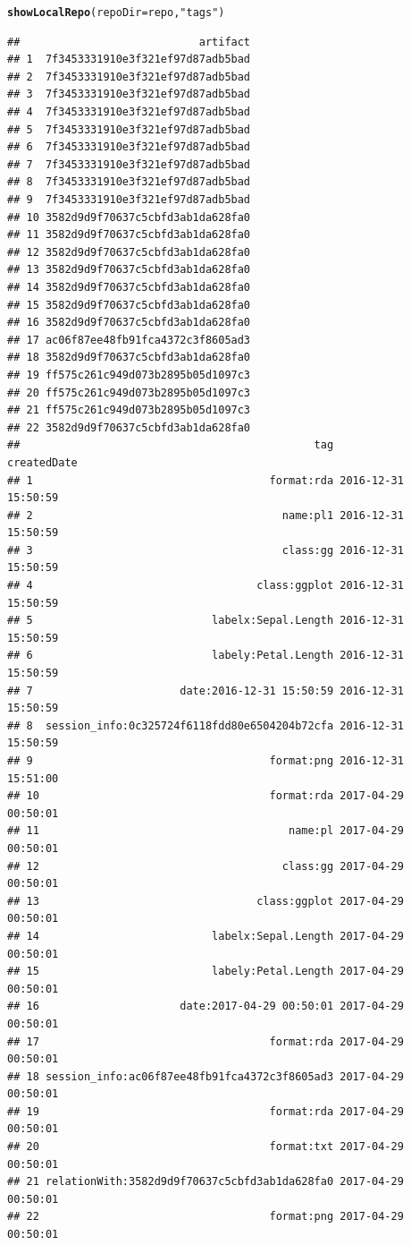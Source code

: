 \documentclass[nojss]{jss}\usepackage[]{graphicx}\usepackage[]{color}
\makeatletter
\newcommand{\hlstr}[1]{\textcolor[rgb]{0.192,0.494,0.8}{#1}}%
\newcommand{\hlstd}[1]{\textcolor[rgb]{0.345,0.345,0.345}{#1}}%
\newcommand{\hlkwc}[1]{\textcolor[rgb]{0.333,0.667,0.333}{#1}}%
\newcommand{\hlkwd}[1]{\textcolor[rgb]{0.737,0.353,0.396}{\textbf{#1}}}%
\newenvironment{kframe}{%
 \def\at@end@of@kframe{}%
 \ifinner\ifhmode%
  \def\at@end@of@kframe{\end{minipage}}%
  \begin{minipage}{\columnwidth}%
 \fi\fi%
 \def\FrameCommand##1{\hskip\@totalleftmargin \hskip-\fboxsep
 \colorbox{shadecolor}{##1}\hskip-\fboxsep
     \hskip-\linewidth \hskip-\@totalleftmargin \hskip\columnwidth}%
 \MakeFramed {\advance\hsize-\width
   \@totalleftmargin\z@ \linewidth\hsize
   \@setminipage}}%
 {\par\unskip\endMakeFramed%
 \at@end@of@kframe}
\newenvironment{knitrout}{}{} %
\makeatother
\begin{document}
\begin{knitrout}
\color{fgcolor}\begin{kframe}
\begin{alltt}
\hlkwd{showLocalRepo}\hlstd{(}\hlkwc{repoDir} \hlstd{= repo,} \hlstr{"tags"}\hlstd{)}
\end{alltt}
\begin{verbatim}
##                            artifact
## 1  7f3453331910e3f321ef97d87adb5bad
## 2  7f3453331910e3f321ef97d87adb5bad
## 3  7f3453331910e3f321ef97d87adb5bad
## 4  7f3453331910e3f321ef97d87adb5bad
## 5  7f3453331910e3f321ef97d87adb5bad
## 6  7f3453331910e3f321ef97d87adb5bad
## 7  7f3453331910e3f321ef97d87adb5bad
## 8  7f3453331910e3f321ef97d87adb5bad
## 9  7f3453331910e3f321ef97d87adb5bad
## 10 3582d9d9f70637c5cbfd3ab1da628fa0
## 11 3582d9d9f70637c5cbfd3ab1da628fa0
## 12 3582d9d9f70637c5cbfd3ab1da628fa0
## 13 3582d9d9f70637c5cbfd3ab1da628fa0
## 14 3582d9d9f70637c5cbfd3ab1da628fa0
## 15 3582d9d9f70637c5cbfd3ab1da628fa0
## 16 3582d9d9f70637c5cbfd3ab1da628fa0
## 17 ac06f87ee48fb91fca4372c3f8605ad3
## 18 3582d9d9f70637c5cbfd3ab1da628fa0
## 19 ff575c261c949d073b2895b05d1097c3
## 20 ff575c261c949d073b2895b05d1097c3
## 21 ff575c261c949d073b2895b05d1097c3
## 22 3582d9d9f70637c5cbfd3ab1da628fa0
##                                              tag         createdDate
## 1                                     format:rda 2016-12-31 15:50:59
## 2                                       name:pl1 2016-12-31 15:50:59
## 3                                       class:gg 2016-12-31 15:50:59
## 4                                   class:ggplot 2016-12-31 15:50:59
## 5                            labelx:Sepal.Length 2016-12-31 15:50:59
## 6                            labely:Petal.Length 2016-12-31 15:50:59
## 7                       date:2016-12-31 15:50:59 2016-12-31 15:50:59
## 8  session_info:0c325724f6118fdd80e6504204b72cfa 2016-12-31 15:50:59
## 9                                     format:png 2016-12-31 15:51:00
## 10                                    format:rda 2017-04-29 00:50:01
## 11                                       name:pl 2017-04-29 00:50:01
## 12                                      class:gg 2017-04-29 00:50:01
## 13                                  class:ggplot 2017-04-29 00:50:01
## 14                           labelx:Sepal.Length 2017-04-29 00:50:01
## 15                           labely:Petal.Length 2017-04-29 00:50:01
## 16                      date:2017-04-29 00:50:01 2017-04-29 00:50:01
## 17                                    format:rda 2017-04-29 00:50:01
## 18 session_info:ac06f87ee48fb91fca4372c3f8605ad3 2017-04-29 00:50:01
## 19                                    format:rda 2017-04-29 00:50:01
## 20                                    format:txt 2017-04-29 00:50:01
## 21 relationWith:3582d9d9f70637c5cbfd3ab1da628fa0 2017-04-29 00:50:01
## 22                                    format:png 2017-04-29 00:50:01
\end{verbatim}
\end{kframe}
\end{knitrout}
\end{document}

